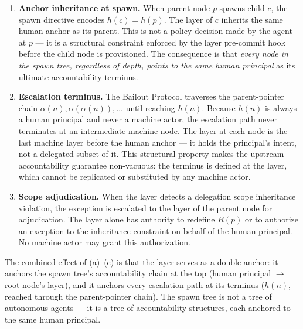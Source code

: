 \begin{enumerate}
  \item[(a)] \textbf{Anchor inheritance at spawn.}  When parent node $p$ spawns
    child $c$, the spawn directive encodes $h(c) = h(p)$.  The \Purpose{} layer
    of $c$ inherits the same human anchor as its parent.  This is not a policy
    decision made by the agent at $p$ — it is a structural constraint enforced
    by the \Fact{} layer pre-commit hook before the child node is provisioned.
    The consequence is that \textit{every node in the spawn tree, regardless of
    depth, points to the same human principal} as its ultimate accountability
    terminus.

  \item[(b)] \textbf{Escalation terminus.}  The Bailout Protocol traverses the
    parent-pointer chain $\alpha(n), \alpha(\alpha(n)), \ldots$ until reaching
    $h(n)$.  Because $h(n)$ is always a human principal and never a machine
    actor, the escalation path never terminates at an intermediate machine
    node.  The \Purpose{} layer at each node is the last machine layer before
    the human anchor — it holds the principal's intent, not a delegated subset
    of it.  This structural property makes the upstream accountability guarantee
    non-vacuous: the terminus is defined at the \Purpose{} layer, which cannot
    be replicated or substituted by any machine actor.

  \item[(c)] \textbf{Scope adjudication.}  When the \Bounds{} layer detects a
    delegation scope inheritance violation, the exception is escalated to the
    \Purpose{} layer of the parent node for adjudication.  The \Purpose{} layer
    alone has authority to redefine $R(p)$ or to authorize an exception to the
    inheritance constraint on behalf of the human principal.  No machine actor
    may grant this authorization.
\end{enumerate}

The combined effect of (a)–(c) is that the \Purpose{} layer serves as a double
anchor: it anchors the spawn tree's accountability chain at the top (human
principal $\rightarrow$ root node's \Purpose{} layer), and it anchors every
escalation path at its terminus ($h(n)$, reached through the parent-pointer
chain).  The spawn tree is not a tree of autonomous agents — it is a tree of
accountability structures, each anchored to the same human principal.

